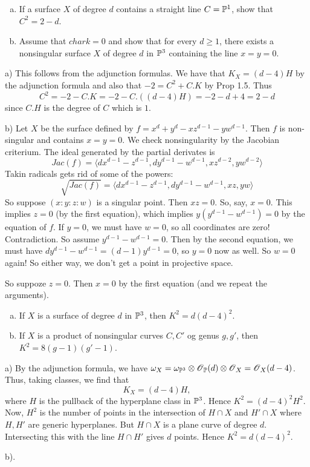 \documentclass[11pt, english]{article}
\begin{document}
\begin{exc}[Exercise 1.4]
  \begin{enumerate}[a)]
  \item If a surface $X$ of degree $d$ contains a straight line $C = \mathbb{P}^1$, show that $C^2=2-d$.
\item Assume that $char k = 0$ and show that for every $d \geq 1$, there exists a nonsingular surface $X$ of degree $d$ in $\mathbb{P}^3$ containing the line $x=y=0$.
  \end{enumerate}
\end{exc}
\begin{sol}
  a) This follows from the adjunction formulas. We have that $K_X = (d-4)H$ by the adjunction formula and also that $-2=C^2+C.K$ by Prop 1.5. Thus
$$
C^2 = -2-C.K = -2-C.((d-4)H)=-2-d+4=2-d
$$
since $C.H$ is the degree of $C$ which is $1$.

b) Let $X$ be the surface defined by $f=x^d+y^d-xz^{d-1}-yw^{d-1}$. Then $f$ is non-singular and contains $x=y=0$. We check nonsingularity by the Jacobian criterium. The ideal generated by the partial derivates is 
$$
Jac(f) = \langle dx^{d-1}-z^{d-1},dy^{d-1}-w^{d-1}, xz^{d-2}, yw^{d-2} \rangle
$$
Takin radicals gets rid of some of the powers:
$$
\sqrt{Jac(f)} = \langle dx^{d-1}-z^{d-1},dy^{d-1}-w^{d-1}, xz, yw \rangle
$$
So suppose $(x:y:z:w)$ is a singular point. Then $xz=0$. So, say, $x=0$. This implies $z=0$ (by the first equation), which implies $y(y^{d-1}-w^{d-1})=0$ by the equation of $f$. If $y=0$, we must have $w=0$, so all coordinates are zero! Contradiction. So assume $y^{d-1}-w^{d-1}=0$. Then by the second equation, we must have $dy^{d-1}-w^{d-1}=(d-1)y^{d-1}=0$, so $y=0$ now as well. So $w=0$ again! So either way, we don't get a point in projective space.

So suppoze $z=0$. Then $x=0$ by the first equation (and we repeat the arguments). 
\end{sol}

\begin{exc}[Exercise 1.5]
  \begin{enumerate}[a)]
  \item If $X$ is a surface of degree $d$ in $\mathbb{P}^3$, then $K^2=d(d-4)^2$. 
\item If $X$ is a product of nonsingular curves $C,C'$ og genus $g,g'$, then $K^2=8(g-1)(g'-1)$.
  \end{enumerate}
\end{exc}

\begin{sol}
  a) By the adjunction formula, we have $\omega_X=\omega_{\mathbb{P}^3} \otimes \operatorname{\mathscr{O}}_{\mathbb{P}}(d) \otimes \operatorname{\mathscr{O}}_X=\operatorname{\mathscr{O}}_X(d-4)$. Thus, taking classes, we find that
$$
K_X = (d-4)H,
$$
where $H$ is the pullback of the hyperplane class in $\mathbb{P}^3$. Hence $K^2=(d-4)^2 H^2$. Now, $H^2$ is the number of points in the intersection of $H \cap X$ and $H' \cap X$ where $H,H'$ are generic hyperplanes. But $H \cap X$ is a plane curve of degree $d$. Intersecting this with the line $H \cap H'$ gives $d$ points. Hence $K^2=d(d-4)^2$.

b).  
\end{sol}
\end{document}
